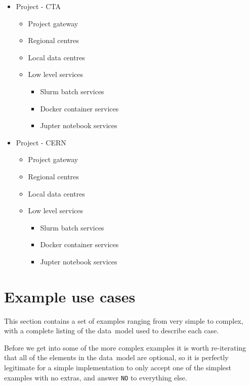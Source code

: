 \documentclass[11pt,a4paper]{ivoa}
\newcommand{\datamodel} {data~model}
\newcommand{\codeword}[1] {\texttt{#1}}
\begin{document}
\begin{itemize}
    \item Project - CTA
    \begin{itemize}
        \item Project gateway
        \item Regional centres
        \item Local data centres
        \item Low level services
        \begin{itemize}
            \item Slurm batch services
            \item Docker container services
            \item Jupter notebook services
        \end{itemize}
    \end{itemize}
\end{itemize}

\begin{itemize}
    \item Project - CERN
    \begin{itemize}
        \item Project gateway
        \item Regional centres
        \item Local data centres
        \item Low level services
        \begin{itemize}
            \item Slurm batch services
            \item Docker container services
            \item Jupter notebook services
        \end{itemize}
    \end{itemize}
\end{itemize}

\section{Example use cases}
\label{example-usecases}

This section contains a set of examples ranging from very simple to complex, with a complete
listing of the \datamodel{} used to describe each case.

Before we get into some of the more complex examples it is worth re-iterating that all of the
elements in the \datamodel{} are optional, so it is perfectly legitimate for a simple
implementation to only accept one of the simplest examples with no extras, and answer
\codeword{NO} to everything else.
\end{document}
